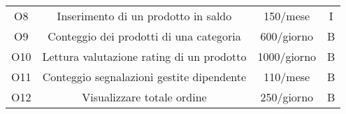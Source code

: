 \begin{center}
\begin{tabular}{ |c|c|c|c|}
\multirow{3}{6em}{O8} & \multirow{3}{8em}{Inserimento di un prodotto in saldo} & \multirow{3}{12em}{150/mese} & \multirow{3}{12em}{I}\\
 & & &\\
 & & &\\
\hline

\multirow{3}{6em}{O9} & \multirow{3}{8em}{Conteggio dei prodotti di una categoria} & \multirow{3}{12em}{600/giorno} & \multirow{3}{12em}{B}\\
 & & &\\
 & & &\\
\hline

\multirow{3}{6em}{O10} & \multirow{3}{8em}{Lettura valutazione rating di un prodotto} & \multirow{3}{12em}{1000/giorno} & \multirow{3}{12em}{B}\\
 & & &\\
 & & &\\
\hline

\multirow{3}{6em}{O11} & \multirow{3}{8em}{Conteggio segnalazioni gestite dipendente} & \multirow{3}{12em}{110/mese} & \multirow{3}{12em}{B}\\
 & & &\\
 & & &\\
\hline

\multirow{3}{6em}{O12} & \multirow{3}{8em}{Visualizzare totale ordine} & \multirow{3}{12em}{250/giorno} & \multirow{3}{12em}{B}\\
 & & &\\
 & & &\\
\hline

\end{tabular}
\end{center}